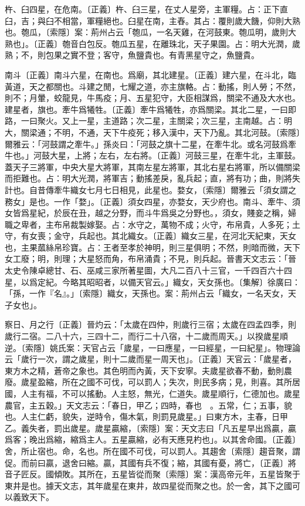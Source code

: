 杵、臼四星，在危南。〔正義〕杵、臼三星，在丈人星旁，主軍糧。占：正下直臼，吉；與臼不相當，軍糧絕也。臼星在南，主舂。其占：覆則歲大饑，仰則大熟也。匏瓜，〔索隱〕案：荊州占云「匏瓜，一名天雞，在河鼓東。匏瓜明，歲則大熟也」。〔正義〕匏音白包反。匏瓜五星，在離珠北，天子果園。占：明大光潤，歲熟；不，則包果之實不登；客守，魚鹽貴也。有青黑星守之，魚鹽貴。

南斗〔正義〕南斗六星，在南也。爲廟，其北建星。〔正義〕建六星，在斗北，臨黃道，天之都關也。斗建之閒，七耀之道，亦主旗輅。占：動搖，則人勞；不然，則不；月暈，蛟龍見，牛馬疫；月、五星犯守，大臣相謀爲，關梁不通及大水也。建星者，旗也。牽牛爲犧牲。〔正義〕牽牛爲犧牲，亦爲關梁。其北二星，一曰即路，一曰聚火。又上一星，主道路；次二星，主關梁；次三星，主南越。占：明大，關梁通；不明，不通，天下牛疫死；移入漢中，天下乃亂。其北河鼓。〔索隱〕爾雅云：「河鼓謂之牽牛。」孫炎曰：「河鼓之旗十二星，在牽牛北。或名河鼓爲牽牛也。」河鼓大星，上將；左右，左右將。〔正義〕河鼓三星，在牽牛北，主軍鼓。蓋天子三將軍，中央大星大將軍，其南左星左將軍，其北右星右將軍，所以備關梁而拒難也。占：明大光潤，將軍吉；動搖差戾，亂兵起；直，將有功；曲，則將失計也。自昔傳牽牛織女七月七日相見，此星也。婺女，〔索隱〕爾雅云「須女謂之務女」是也。一作「婺」。〔正義〕須女四星，亦婺女，天少府也。南斗、牽牛、須女皆爲星紀，於辰在丑，越之分野，而斗牛爲吳之分野也。，須女，賤妾之稱，婦職之卑者，主布帛裁製嫁娶。占：水守之，萬物不成；火守，布帛貴，人多死；土守，有女喪；金守，兵起也。其北織女。〔正義〕織女三星，在河北天紀東，天女也，主果蓏絲帛珍寶。占：王者至孝於神明，則三星俱明；不然，則暗而微，天下女工廢；明，則理；大星怒而角，布帛涌貴；不見，則兵起。晉書天文志云：「晉太史令陳卓總甘、石、巫咸三家所著星圖，大凡二百八十三官，一千四百六十四星，以爲定紀。今略其昭昭者，以備天官云。」織女，天女孫也。〔集解〕徐廣曰：「孫，一作『名』。」〔索隱〕織女，天孫也。案：荊州占云「織女，一名天女，天子女也」。

察日、月之行〔正義〕晉灼云：「太歲在四仲，則歲行三宿；太歲在四孟四季，則歲行二宿。二八十六，三四十二，而行二十八宿，十二歲而周天。」以揆歲星順逆。〔索隱〕姚氏案：天官占云「歲星，一曰應星，一曰經星，一曰紀星」。物理論云「歲行一次，謂之歲星，則十二歲而星一周天也」。〔正義〕天官云：「歲星者，東方木之精，蒼帝之象也。其色明而內黃，天下安寧。夫歲星欲春不動，動則農廢。歲星盈縮，所在之國不可伐，可以罰人；失次，則民多病；見，則喜。其所居國，人主有福，不可以搖動。人主怒，無光，仁道失。歲星順行，仁德加也。歲星農官，主五穀。」天文志云：「春日，甲乙；四時，春也　。五常，仁；五事，貌也。人主仁虧，貌失，逆時令，傷木氣，則罰見歲星。」曰東方木，主春，日甲乙。義失者，罰出歲星。歲星贏縮，〔索隱〕案：天文志曰「凡五星早出爲贏，贏爲客；晚出爲縮，縮爲主人。五星贏縮，必有天應見杓也」。以其舍命國。〔正義〕舍，所止宿也。命，名也。所在國不可伐，可以罰人。其趨舍〔索隱〕趨音聚，謂促。而前曰贏，退舍曰縮。贏，其國有兵不復；縮，其國有憂，將亡，〔正義〕將音子匠反。國傾敗。其所在，五星皆從而聚〔索隱〕案：漢高帝元年，五星皆聚于東井是也。據天文志，其年歲星在東井，故四星從而聚之也。於一舍，其下之國可以義致天下。

